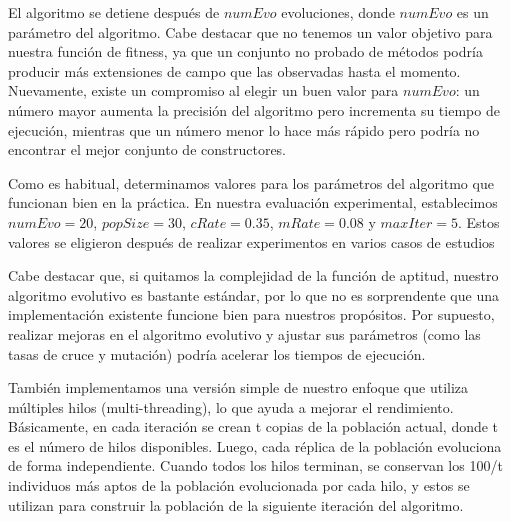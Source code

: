 
El algoritmo se detiene después de $numEvo$ evoluciones, donde $numEvo$ es un parámetro del algoritmo. 
Cabe destacar que no tenemos un valor objetivo para nuestra función de fitness, 
ya que un conjunto no probado de métodos podría producir más extensiones de campo que las observadas hasta el momento. 
Nuevamente, existe un compromiso al elegir un buen valor para $numEvo$: un número mayor aumenta la precisión del algoritmo pero incrementa su tiempo de ejecución, 
mientras que un número menor lo hace más rápido pero podría no encontrar el mejor conjunto de constructores.

Como es habitual, determinamos valores para los parámetros del algoritmo que funcionan bien en la práctica. 
En nuestra evaluación experimental, establecimos $numEvo=20$, $popSize=30$, $cRate=0.35$, $mRate=0.08$ 
y $maxIter=5$. Estos valores se eligieron después de realizar experimentos en varios casos de estudios

Cabe destacar que, si quitamos la complejidad de la función de aptitud, nuestro algoritmo evolutivo es bastante estándar, por lo que no es sorprendente que una implementación existente funcione bien para nuestros propósitos. Por supuesto, realizar mejoras en el algoritmo evolutivo y ajustar sus parámetros (como las tasas de cruce y mutación) podría acelerar los tiempos de ejecución.

También implementamos una versión simple de nuestro enfoque que utiliza múltiples hilos (multi-threading), lo que ayuda a mejorar el rendimiento. Básicamente, en cada iteración se crean t copias de la población actual, donde t es el número de hilos disponibles. Luego, cada réplica de la población evoluciona de forma independiente. Cuando todos los hilos terminan, se conservan los 100/t individuos más aptos de la población evolucionada por cada hilo, y estos se utilizan para construir la población de la siguiente iteración del algoritmo.

